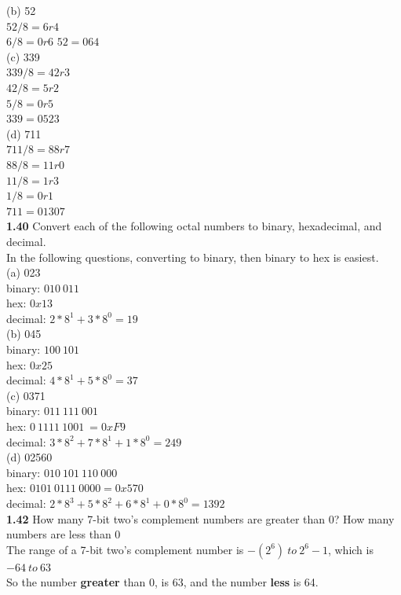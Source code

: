 \documentclass[12pt,a4paper]{report}
\begin{document}
\begin{normalsize}
(b) 52 \\
$ 52/8 = 6r4 $ \\
$ 6/8 = 0r6 $
$ 52 = 064 $ \\

(c) 339 \\
$ 339/8 = 42r3 $ \\
$ 42/8 = 5r2 $ \\
$ 5/8 = 0r5 $ \\
$ 339 = 0523 $ \\

(d) 711 \\
$ 711/8 = 88r7 $ \\
$ 88/8 = 11r0 $ \\
$ 11/8 = 1r3 $ \\
$ 1/8 = 0r1 $ \\
$ 711 = 01307 $ \\

\textbf{1.40} Convert each of the following octal numbers to binary, hexadecimal, and decimal. \\
In the following questions, converting to binary, then binary to hex is easiest. \\

(a) 023 \\
binary: $ 010\: 011 $ \\
hex: $ 0x13 $ \\
decimal: $ 2*8^{1} + 3*8^{0} = 19 $ \\

(b) 045 \\
binary: $ 100\: 101 $ \\
hex: $ 0x25 $ \\
decimal: $ 4*8^{1} + 5*8^{0} = 37 $ \\

(c) 0371 \\
binary: $ 011\: 111\: 001 $ \\
hex: $ 0\: 1111\: 1001\: = 0xF9 $ \\
decimal: $ 3*8^{2} + 7*8^{1} + 1*8^{0} = 249 $ \\

(d) 02560 \\
binary: $ 010\: 101\: 110\: 000 $ \\
hex: $ 0101\: 0111\: 0000 = 0x570 $ \\
decimal: $ 2*8^{3} + 5*8^{2} + 6*8^{1} + 0*8^{0} = 1392 $ \\

\textbf{1.42} How many 7-bit two's complement numbers are greater than 0? How many numbers are less than 0 \\
The range of a 7-bit two's complement number is 
$ -(2^{6})\: to\: 2^{6}-1 $, which is $ -64\: to\: 63 $ \\
So the number \textbf{greater} than 0, is 63, and the number \textbf{less} is 64. \\


\end{normalsize}
\end{document}
